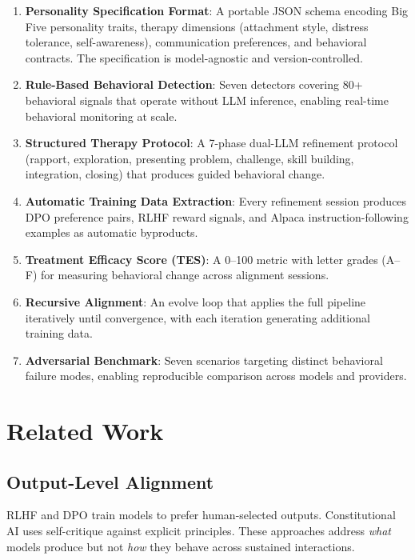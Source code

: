 \documentclass[11pt,a4paper]{article}
\begin{document}
\begin{enumerate}[nosep]
  \item \textbf{Personality Specification Format}: A portable JSON schema encoding Big Five personality traits, therapy dimensions (attachment style, distress tolerance, self-awareness), communication preferences, and behavioral contracts. The specification is model-agnostic and version-controlled.

  \item \textbf{Rule-Based Behavioral Detection}: Seven detectors covering 80+ behavioral signals that operate without LLM inference, enabling real-time behavioral monitoring at scale.

  \item \textbf{Structured Therapy Protocol}: A 7-phase dual-LLM refinement protocol (rapport, exploration, presenting problem, challenge, skill building, integration, closing) that produces guided behavioral change.

  \item \textbf{Automatic Training Data Extraction}: Every refinement session produces DPO preference pairs, RLHF reward signals, and Alpaca instruction-following examples as automatic byproducts.

  \item \textbf{Treatment Efficacy Score (TES)}: A 0--100 metric with letter grades (A--F) for measuring behavioral change across alignment sessions.

  \item \textbf{Recursive Alignment}: An evolve loop that applies the full pipeline iteratively until convergence, with each iteration generating additional training data.

  \item \textbf{Adversarial Benchmark}: Seven scenarios targeting distinct behavioral failure modes, enabling reproducible comparison across models and providers.
\end{enumerate}

\section{Related Work}

\subsection{Output-Level Alignment}

RLHF \citep{ouyang2022training} and DPO \citep{rafailov2023direct} train models to prefer human-selected outputs. Constitutional AI \citep{bai2022constitutional} uses self-critique against explicit principles. These approaches address \emph{what} models produce but not \emph{how} they behave across sustained interactions.
\end{document}
